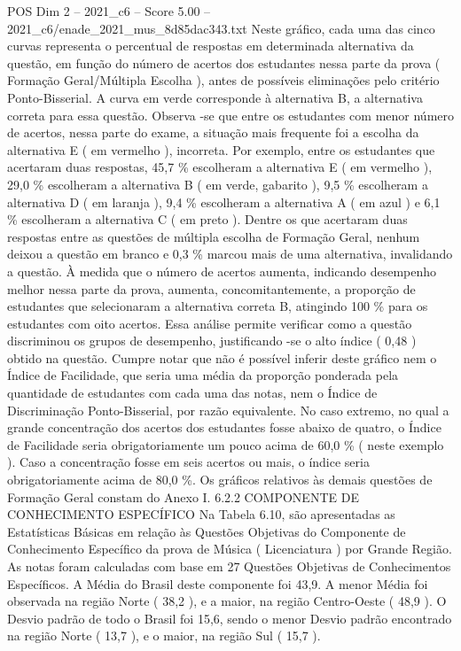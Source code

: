 \begin{textsample}{POS Dim 2 – 2021\_c6 – Score 5.00 – 2021\_c6/enade\_2021\_mus\_8d85dac343.txt}
Neste gráfico, cada uma das cinco curvas representa o percentual de respostas em determinada alternativa da questão, em função do número de acertos dos estudantes nessa parte da prova ( Formação Geral/Múltipla Escolha ), antes de possíveis eliminações pelo critério Ponto-Bisserial.
A curva em verde corresponde à alternativa B, a alternativa correta para essa questão.
Observa -se que entre os estudantes com menor número de acertos, nessa parte do exame, a situação mais frequente foi a escolha da alternativa E ( em vermelho ), incorreta.
Por exemplo, entre os estudantes que acertaram duas respostas, 45,7 \% escolheram a alternativa E ( em vermelho ), 29,0 \% escolheram a alternativa B ( em verde, gabarito ), 9,5 \% escolheram a alternativa D ( em laranja ), 9,4 \% escolheram a alternativa A ( em azul ) e 6,1 \% escolheram a alternativa C ( em preto ).
Dentre os que acertaram duas respostas entre as questões de múltipla escolha de Formação Geral, nenhum deixou a questão em branco e 0,3 \% marcou mais de uma alternativa, invalidando a questão.
À medida que o número de acertos aumenta, indicando desempenho melhor nessa parte da prova, aumenta, concomitantemente, a proporção de estudantes que selecionaram a alternativa correta B, atingindo 100 \% para os estudantes com oito acertos.
Essa análise permite verificar como a questão discriminou os grupos de desempenho, justificando -se o alto índice ( 0,48 ) obtido na questão.
Cumpre notar que não é possível inferir deste gráfico nem o Índice de Facilidade, que seria uma média da proporção ponderada pela quantidade de estudantes com cada uma das notas, nem o Índice de Discriminação Ponto-Bisserial, por razão equivalente.
No caso extremo, no qual a grande concentração dos acertos dos estudantes fosse abaixo de quatro, o Índice de Facilidade seria obrigatoriamente um pouco acima de 60,0 \% ( neste exemplo ).
Caso a concentração fosse em seis acertos ou mais, o índice seria obrigatoriamente acima de 80,0 \%.
Os gráficos relativos às demais questões de Formação Geral constam do Anexo I. 6.2.2 COMPONENTE DE CONHECIMENTO ESPECÍFICO Na Tabela 6.10, são apresentadas as Estatísticas Básicas em relação às Questões Objetivas do Componente de Conhecimento Específico da prova de Música ( Licenciatura ) por Grande Região.
As notas foram calculadas com base em 27 Questões Objetivas de Conhecimentos Específicos.
A Média do Brasil deste componente foi 43,9.
A menor Média foi observada na região Norte ( 38,2 ), e a maior, na região Centro-Oeste ( 48,9 ).
O Desvio padrão de todo o Brasil foi 15,6, sendo o menor Desvio padrão encontrado na região Norte ( 13,7 ), e o maior, na região Sul ( 15,7 ).

\end{textsample}
